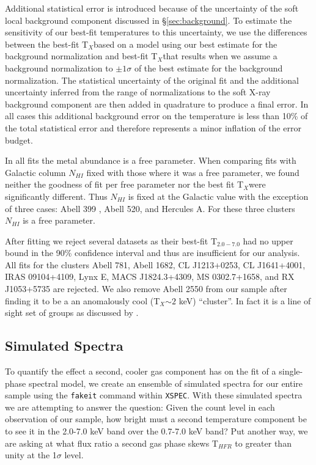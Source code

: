 \documentclass{emulateapj}
\newcommand{\tf}{T$_{HFR}$ }
\newcommand{\hard}{T$_{2.0-7.0}$ }
\newcommand{\tx}{T$_{X}$}
\begin{document}
Additional statistical error is introduced because of the uncertainty
of the soft local background component discussed in
\S\ref{sec:background}. To estimate the sensitivity of our best-fit
temperatures to this uncertainty, we use the differences between the
best-fit \tx based on a model using our best estimate for the background
normalization and best-fit \tx that results when we assume a
background normalization to $\pm1\sigma$ of the best estimate for the
background normalization. The statistical uncertainty of the original
fit and the additional uncertainty inferred
from the range of normalizations to the soft X-ray background
component are then added in quadrature to produce a final error. In
all cases this additional background error on the temperature is less
than 10\% of the total statistical error and therefore represents a
minor inflation of the error budget.

In all fits the metal abundance is a free parameter. When comparing
fits with Galactic column $N_{HI}$ fixed with those where it
was a free parameter, we found neither the goodness of fit per
free parameter nor the best fit \tx were significantly different. Thus
$N_{HI}$ is fixed at the Galactic value with the exception of three
cases: Abell 399 \citep{2004MNRAS.351.1439S}, Abell 520, and Hercules
A. For these three clusters $N_{HI}$ is a free parameter.

After fitting we reject several datasets as their best-fit \hard
had no upper bound in the 90\% confidence interval and thus are
insufficient for our analysis. All fits for the clusters Abell 781,
Abell 1682, CL J1213+0253, CL J1641+4001, IRAS 09104+4109, Lynx E,
MACS J1824.3+4309, MS 0302.7+1658, and RX J1053+5735 are rejected. We
also remove Abell 2550 from our sample after finding it to be a
an anomalously cool (\tx $\sim 2$ keV) ``cluster''. In fact it is a line
of sight set of groups as discussed by \cite{2004cgpc.sympE..31M}.

\subsection{Simulated Spectra}\label{sec:simulated}

To quantify the effect a second, cooler gas component has on the fit
of a single-phase spectral model, we create an ensemble of simulated
spectra for our entire sample using the {\tt fakeit} command within
{\tt XSPEC}. With these simulated spectra we are attempting to answer the
question: Given the count level in each observation of our sample, how
bright must a second temperature component be to see it in the 2.0-7.0
keV band over the 0.7-7.0 keV band?  Put another way, we are asking at
what flux ratio a second gas phase skews \tf to greater than unity at
the 1$\sigma$ level.
\end{document}
